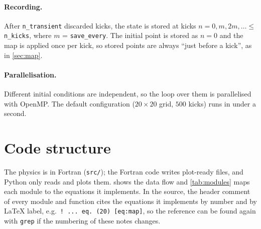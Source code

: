 \documentclass[11pt,a4paper]{article}
\begin{document}
\paragraph{Recording.} After \texttt{n\_transient} discarded kicks, the state is stored at kicks $n = 0, m, 2m,
\dots \le$ \texttt{n\_kicks}, where $m$ = \texttt{save\_every}. The initial point is stored as $n=0$ and
the map is applied once per kick, so stored points are always ``just before a kick'', as in \cref{sec:map}.

\paragraph{Parallelisation.} Different initial conditions are independent, so the loop over them is parallelised with
OpenMP. The default configuration ($20\times20$ grid, $500$ kicks) runs in under a second.

\section{Code structure}\label{sec:code}

The physics is in Fortran (\texttt{src/}); the Fortran code writes plot-ready files, and Python only reads and plots
them.  shows the data flow and \cref{tab:modules} maps each module to the equations it implements. In
the source, the header comment of every module and function cites the equations it implements by number and by
\LaTeX{} label, e.g.\ \texttt{! ... eq.~(20) [eq:map]}, so the reference can be found again with \texttt{grep} if the
numbering of these notes changes.
\end{document}
